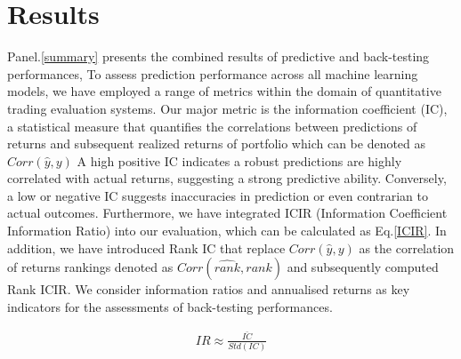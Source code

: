 \documentclass[10pt,letterpaper]{article}
\begin{document}




\section*{Results}
Panel.\ref{summary} presents the combined results of predictive and back-testing performances, To assess prediction performance across all machine learning models, we have employed a range of metrics within the domain of quantitative trading evaluation systems. Our major metric is the information coefficient (IC), a statistical measure that quantifies the correlations between predictions of returns and subsequent realized returns of portfolio which can be denoted as \(Corr(\hat{y},{y})\)  A high positive IC indicates a robust predictions are highly correlated with actual returns, suggesting a strong predictive ability. Conversely, a low or negative IC suggests inaccuracies in prediction or even contrarian to actual outcomes. Furthermore, we have integrated ICIR (Information Coefficient Information Ratio) into our evaluation, which can be calculated as Eq.\ref{ICIR}. In addition, we have introduced Rank IC that replace \(Corr(\hat{y},{y})\) as the correlation of returns rankings denoted as \(Corr(\hat{rank},{rank})\) and subsequently computed Rank ICIR. We consider information ratios and annualised returns as key indicators for the assessments of back-testing performances.

\begin{eqnarray}
\label{ICIR}
IR \approx \frac{\bar{IC}}{Std(IC)}
\end{eqnarray}
\end{document}
